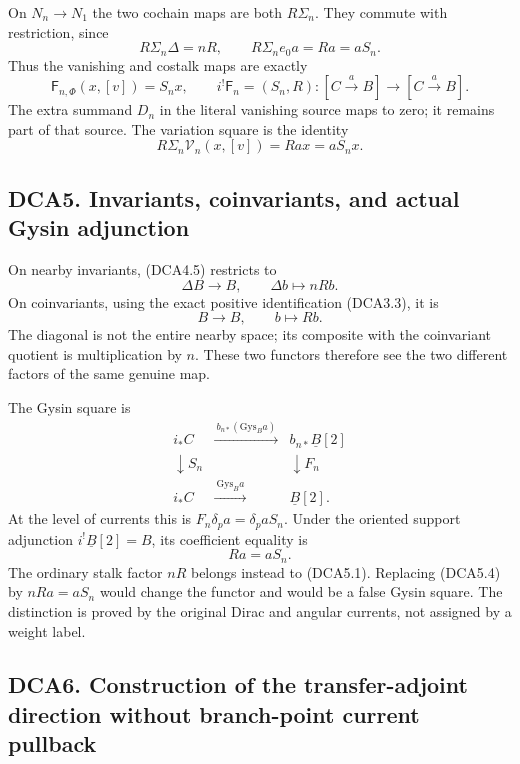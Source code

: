 On \(N_n\to N_1\) the two cochain maps are both \(R\Sigma_n\). They
commute with restriction, since \[
R\Sigma_n\Delta=nR,\qquad
R\Sigma_ne_0a=Ra=aS_n.
\tag{DCA4.6}
\] Thus the vanishing and costalk maps are exactly \[
\boxed{\mathsf F_{n,\Phi}(x,[v])=S_nx,\qquad
i^!\mathsf F_n=(S_n,R):[C\xrightarrow{a}B]\to[C\xrightarrow{a}B].}
\tag{DCA4.7}
\] The extra summand \(D_n\) in the literal vanishing source maps to
zero; it remains part of that source. The variation square is the
identity \[
R\Sigma_n\mathcal V_n(x,[v])=Rax=aS_nx.
\tag{DCA4.8}
\]

\subsection{DCA5. Invariants, coinvariants, and actual Gysin
adjunction}\label{dca5.-invariants-coinvariants-and-actual-gysin-adjunction}

On nearby invariants, (DCA4.5) restricts to \[
\Delta B\to B,\qquad\Delta b\longmapsto nRb.
\tag{DCA5.1}
\] On coinvariants, using the exact positive identification (DCA3.3), it
is \[
B\to B,\qquad b\longmapsto Rb.
\tag{DCA5.2}
\] The diagonal is not the entire nearby space; its composite with the
coinvariant quotient is multiplication by \(n\). These two functors
therefore see the two different factors of the same genuine map.

The Gysin square is \[
\begin{array}{ccc}
i_*C&\xrightarrow{\ b_{n*}(\mathrm{Gys}_Ba)\ }&b_{n*}\underline B[2]\\
\downarrow S_n&&\downarrow F_n\\
i_*C&\xrightarrow{\ \mathrm{Gys}_Ba\ }&\underline B[2].
\end{array}
\tag{DCA5.3}
\] At the level of currents this is \(F_n\delta_pa=\delta_paS_n\). Under
the oriented support adjunction \(i^!\underline B[2]=B\), its
coefficient equality is \[
Ra=aS_n.
\tag{DCA5.4}
\] The ordinary stalk factor \(nR\) belongs instead to (DCA5.1).
Replacing (DCA5.4) by \(nRa=aS_n\) would change the functor and would be
a false Gysin square. The distinction is proved by the original Dirac
and angular currents, not assigned by a weight label.

\subsection{DCA6. Construction of the transfer-adjoint direction without
branch-point current
pullback}\label{dca6.-construction-of-the-transfer-adjoint-direction-without-branch-point-current-pullback}


